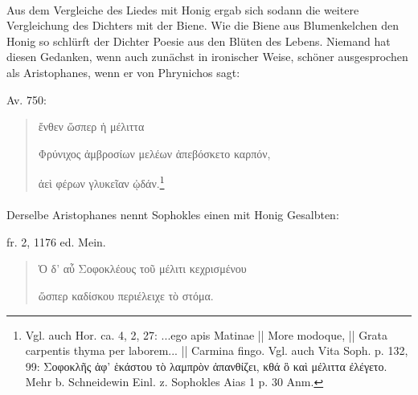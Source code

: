 \documentclass[a4paper, 11pt, oneside]{article}
\begin{document}
\paragraph{}
Aus dem Vergleiche des Liedes mit Honig ergab sich sodann die weitere Vergleichung des Dichters mit der Biene. Wie die Biene aus Blumenkelchen den Honig so schlürft der Dichter Poesie aus den Blüten des Lebens. 
Niemand hat diesen Gedanken, wenn auch zunächst in ironischer Weise, schöner ausgesprochen als Aristophanes, wenn er von Phrynichos sagt:

Av. 750:
\begin{quotation}
ἔνθεν ὥσπερ ἡ μέλιττα

Φρύνιχος ἀμβροσίων μελέων ἀπεβόσκετο καρπόν,

ἀεὶ φέρων γλυκεῖαν ᾠδάν.\footnote{Vgl. auch Hor. ca. 4, 2, 27: ...ego apis Matinae || More modoque, || Grata carpentis thyma per laborem... || Carmina fingo. Vgl. auch Vita Soph. p. 132, 99: Σοφοκλῆς ἀφ' ἑκάστου τὸ λαμπρὸν ἀπανθίζει, κθά ὃ καὶ μέλιττα ἐλέγετο. Mehr b. Schneidewin Einl. z. Sophokles Aias 1 p. 30 Anm.}
\end{quotation}
\paragraph{}
Derselbe Aristophanes nennt Sophokles einen mit Honig Gesalbten:

fr. 2, 1176 ed. Mein.
\begin{quotation}
Ὁ δ' αὖ Σοφοκλέους τοῦ μέλιτι κεχρισμένου

ὥσπερ καδίσκου περιέλειχε τὸ στόμα.
\end{quotation}
\end{document}

